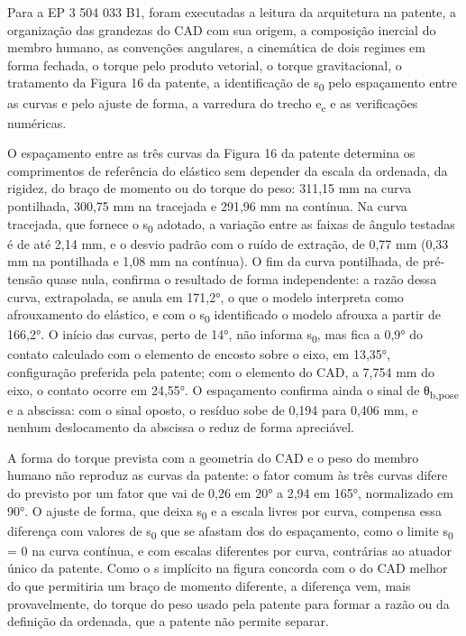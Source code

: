 Para a EP 3 504 033 B1, foram executadas a leitura da arquitetura na patente, a organização das grandezas do CAD com sua origem, a composição inercial do membro humano, as convenções angulares, a cinemática de dois regimes em forma fechada, o torque pelo produto vetorial, o torque gravitacional, o tratamento da Figura 16 da patente, a identificação de s\textsubscript{0} pelo espaçamento entre as curvas e pelo ajuste de forma, a varredura do trecho e\textsubscript{c} e as verificações numéricas.

O espaçamento entre as três curvas da Figura 16 da patente determina os comprimentos de referência do elástico sem depender da escala da ordenada, da rigidez, do braço de momento ou do torque do peso: 311,15 mm na curva pontilhada, 300,75 mm na tracejada e 291,96 mm na contínua. Na curva tracejada, que fornece o s\textsubscript{0} adotado, a variação entre as faixas de ângulo testadas é de até 2,14 mm, e o desvio padrão com o ruído de extração, de 0,77 mm (0,33 mm na pontilhada e 1,08 mm na contínua). O fim da curva pontilhada, de pré-tensão quase nula, confirma o resultado de forma independente: a razão dessa curva, extrapolada, se anula em 171,2°, o que o modelo interpreta como afrouxamento do elástico, e com o s\textsubscript{0} identificado o modelo afrouxa a partir de 166,2°. O início das curvas, perto de 14°, não informa s\textsubscript{0}, mas fica a 0,9° do contato calculado com o elemento de encosto sobre o eixo, em 13,35°, configuração preferida pela patente; com o elemento do CAD, a 7,754 mm do eixo, o contato ocorre em 24,55°. O espaçamento confirma ainda o sinal de θ\textsubscript{b,pose} e a abscissa: com o sinal oposto, o resíduo sobe de 0,194 para 0,406 mm, e nenhum deslocamento da abscissa o reduz de forma apreciável.

A forma do torque prevista com a geometria do CAD e o peso do membro humano não reproduz as curvas da patente: o fator comum às três curvas difere do previsto por um fator que vai de 0,26 em 20° a 2,94 em 165°, normalizado em 90°. O ajuste de forma, que deixa s\textsubscript{0} e a escala livres por curva, compensa essa diferença com valores de s\textsubscript{0} que se afastam dos do espaçamento, como o limite s\textsubscript{0} = 0 na curva contínua, e com escalas diferentes por curva, contrárias ao atuador único da patente. Como o s implícito na figura concorda com o do CAD melhor do que permitiria um braço de momento diferente, a diferença vem, mais provavelmente, do torque do peso usado pela patente para formar a razão ou da definição da ordenada, que a patente não permite separar.

